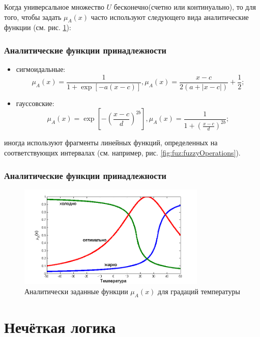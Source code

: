 Когда универсальное множество $U$ бесконечно(счетно или континуально), то для того, чтобы задать $\mu_A(x)$ часто используют следующего вида аналитические функции (см. рис. \ref{fig:fuz:fuzzyTemperature}): 

\begin{frame}
    \frametitle{Аналитические функции принадлежности}
    
    \begin{itemize}
        \item сигмоидальные:
        \[
            \mu_A(x)=\frac{1}{1+\exp\left[-a(x-c)\right]},\mu_A(x)=\frac{x-c}{2(a+|x-c|)}+\frac{1}{2};
        \]
        
        \item гауссовские:
        \[
            \mu_A(x)=\exp\left[-\left(\frac{x-c}{d}\right)^{2b}\right],
            \mu_A(x)=\frac{1}{1+\left(\frac{x-c}{d}\right)^{2b}};
        \]
    \end{itemize}
\end{frame}

иногда используют фрагменты линейных функций, определенных на соответствующих интервалах (см. например, рис. \ref{fig:fuz:fuzzyOperations}).

\begin{frame}
    \frametitle{Аналитические функции принадлежности}
    
    \begin{figure}[!ht]
        \centering
        \includegraphics[width=0.8\textwidth]{fig/fuzzyTemperature}
        \caption{Аналитически заданные функции $\mu_A(x)$ для градаций температуры}
        \label{fig:fuz:fuzzyTemperature}
    \end{figure} 
\end{frame}


\section{Нечёткая логика}


